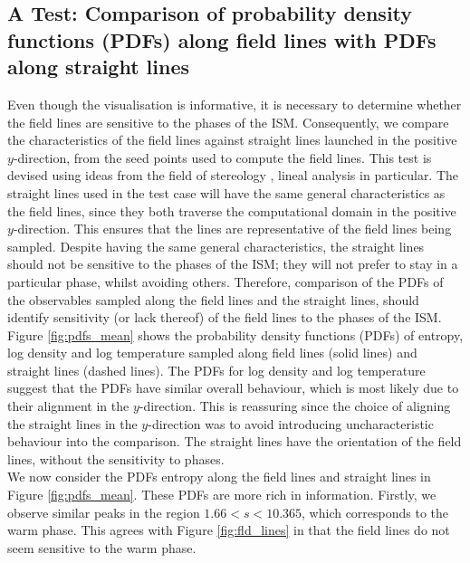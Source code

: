 \documentclass[useAMS,usenatbib]{mn2e}
\begin{document}
\subsection{A Test: Comparison of probability density functions (PDFs) along field lines with PDFs along straight lines}
Even though the visualisation is informative, it is necessary to determine whether the field lines are sensitive to the phases of the ISM. Consequently, we compare the characteristics of the field lines against straight lines launched in the positive $y$-direction, from the seed points used to compute the field lines. This test is devised using ideas from the field of stereology \citep{stereo}, lineal analysis in particular. The straight lines used in the test case will have the same general characteristics as the field lines, since they both traverse the computational domain in the positive $y$-direction. This ensures that the lines are representative of the field lines being sampled. Despite having the same general characteristics, the straight lines should not be sensitive to the phases of the ISM; they will not prefer to stay in a particular phase, whilst avoiding others. Therefore, comparison of the PDFs of the observables sampled along the field lines and the straight lines, should identify sensitivity (or lack thereof) of the field lines to the phases of the ISM.\\
\noindent Figure \vref{fig:pdfs_mean} shows the probability density functions (PDFs) of entropy, log density and log temperature sampled along field lines (solid lines) and straight lines (dashed lines). The PDFs for log density and log temperature suggest that the PDFs have similar overall behaviour, which is most likely due to their alignment in the $y$-direction. This is reassuring since the choice of aligning the straight lines in the $y$-direction was to avoid introducing uncharacteristic behaviour into the comparison. The straight lines have the orientation of the field lines, without the sensitivity to phases.\\
We now consider the PDFs entropy along the field lines and straight lines in Figure \ref{fig:pdfs_mean}. These PDFs are more rich in information. Firstly, we observe similar peaks in the region $1.66<s<10.365$, which corresponds to the warm phase. This agrees with Figure \vref{fig:fld_lines} in that the field lines do not seem sensitive to the warm phase. \\
\end{document}
